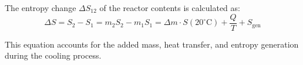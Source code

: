 The entropy change \( \Delta S_{12} \) of the reactor contents is calculated as:  
\[
\Delta S = S_2 - S_1 = m_2 S_2 - m_1 S_1 = \Delta m \cdot S(20^\circ\text{C}) + \frac{Q}{T} + S_{\text{gen}}
\]  

This equation accounts for the added mass, heat transfer, and entropy generation during the cooling process.